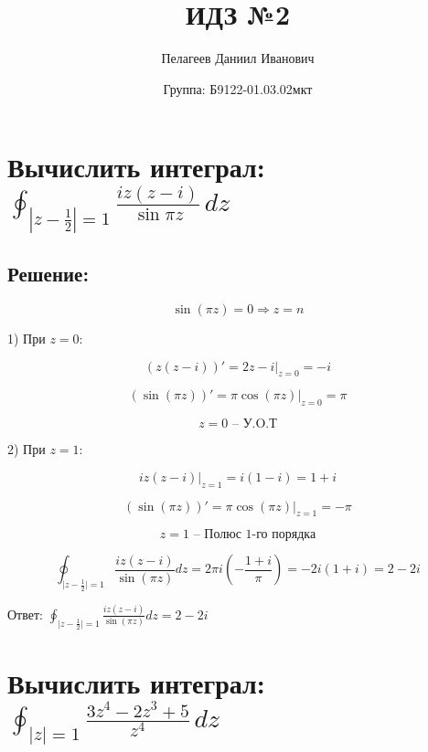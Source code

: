 \documentclass{article}
\title{\vspace{-1cm}ИДЗ №2}
\author{Пелагеев Даниил Иванович}
\date{Группа: Б9122-01.03.02мкт}
\begin{document}
	
\maketitle

\section{Вычислить интеграл: $\oint_{|z - \frac{1}{2}| = 1} \frac{iz(z - i)}{\sin \pi z} \, dz$}
\subsection{Решение:}

\[
\sin (\pi z) = 0 \Rightarrow z = n
\]



1) При $z = 0$:

\[
(z (z - i))'= 2z - i \Bigg|_{z=0} = -i
\]

\[
\left( \sin (\pi z) \right)' = \pi \cos (\pi z) \Bigg|_{z=0} = \pi
\]

\[
z = 0 \text{ – У.O.Т}
\]

2) При $z = 1$:

\[
i z (z - i) \Bigg|_{z=1} = i (1 - i) = 1 + i
\]

\[
\left( \sin (\pi z) \right)' = \pi \cos (\pi z) \Bigg|_{z=1} = -\pi
\]

\[
z = 1 \text{ – Полюс 1-го порядка}
\]

\[
\oint_{\lvert z - \frac{1}{2} \rvert = 1} \frac{i z (z - i)}{\sin (\pi z)} dz = 2 \pi i \left(- \frac{1 + i}{\pi} \right) = -2 i (1 + i) = 2 - 2i
\]

Ответ: 
$
\oint_{\lvert z - \frac{1}{2} \rvert = 1} \frac{i z (z - i)}{\sin (\pi z)} dz = 2 - 2i
$

\section{Вычислить интеграл: $\oint_{|z| = 1} \frac{3z^4 - 2z^3 + 5}{z^4} \, dz$}
\end{document}
